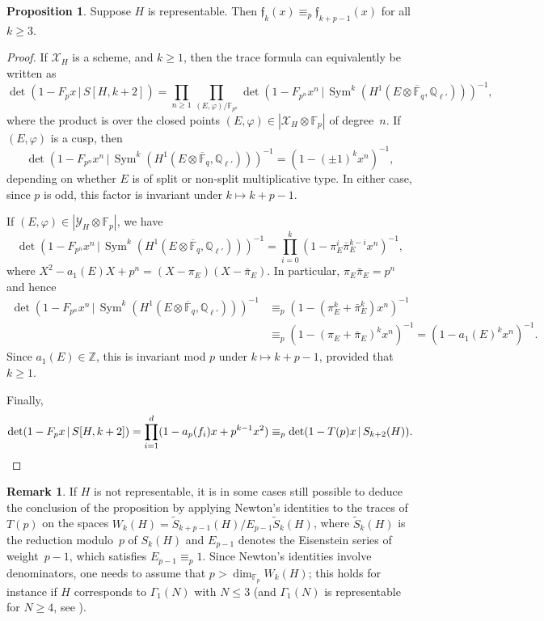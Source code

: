 \documentclass[10pt]{article}
\theoremstyle{definition}
\newtheorem{proposition}[theorem]{Proposition}
\newtheorem{remark}[theorem]{Remark}
\let\phi\varphi
\DeclareMathOperator\Sym{Sym}
\renewcommand{\:}{\colon}
\let\tl\widetilde
\newcommand{\bF}{\mathbb{F}}
\newcommand{\f}{\mathfrak{f}}
\begin{document}
\begin{proposition}\label{prop:pols}
    Suppose $H$ is representable. 
    Then $\f_{k}(x) \equiv_p \f_{k+p-1}(x)$ for all $k \geq 3$.
\end{proposition}

\begin{proof}
If $\mathcal{X}_H$ is a scheme, and $k \geq 1$, then the trace formula can equivalently be written as
\[
\det(1-F_px \, | \, S[H,k+2]) = \prod_{n \geq 1} \prod_{(E,\phi)/\mathbb F_{p^n}} \det(1-F_{p^n}x^n \, | \, \Sym^k(H^1(E \otimes \overline{\bF}_q, \mathbb Q_{\ell'})))^{-1},
\]
where the product is over the closed points $(E,\phi) \in |\mathcal{X}_H \otimes \mathbb F_p|$ of degree~$n$. If $(E,\phi)$ is a cusp, then 
\[
\det(1-F_{p^n}x^n \, | \, \Sym^k(H^1(E \otimes \overline{\bF}_q, \mathbb Q_{\ell'})))^{-1} = (1 - (\pm 1)^{k} x^n)^{-1},
\]
depending on whether $E$ is of split or non-split multiplicative type. In either case, since $p$ is odd, this factor is invariant under $k \mapsto k + p-1$.

If $(E,\phi) \in |\mathcal{Y}_H \otimes \mathbb F_p|$, we have
\[
\det(1-F_{p^n}x^n \, | \, \Sym^k(H^1(E\otimes \overline{\bF}_q, \mathbb Q_{\ell'})))^{-1} = \prod_{i=0}^k (1- \pi_E^i \bar{\pi}_E^{k-i}x^n)^{-1}, 
\]
where $X^2 - a_1(E) X + p^n = (X-\pi_E)(X-\bar{\pi}_E)$. In particular, $\pi_E \bar{\pi}_E = p^n$ and hence
\begin{align*}
\det(1-F_{p^n}x^n \, | \, \Sym^k(H^1(E\otimes \overline{\bF}_q, \mathbb Q_{\ell'})))^{-1} &\equiv_{p} (1-(\pi_E^k + \bar{\pi}_E^k)x^n)^{-1} \\
&\equiv_{p} (1 - (\pi_E + \bar{\pi}_E)^kx^n)^{-1} = (1-a_1(E)^kx^n)^{-1}.
\end{align*}
Since $a_1(E) \in \mathbb Z$, this is invariant mod $p$ under $k \mapsto k + p-1$, provided that $k \geq 1$.

Finally,
\[
\det(1-F_px \, | \, S[H,k+2]) = \prod_{i=1}^d (1 - a_p(f_i)x + p^{k-1}x^2) \equiv_p \det(1-T(p)x \, | \, S_{k+2}(H)). \qedhere
\]
\end{proof}

\begin{remark}
    If $H$ is not representable, it is in some cases still possible to deduce the conclusion of the proposition by applying Newton's identities to the traces of $T(p)$ on the spaces $W_k(H) = \tl{S}_{k+p-1}(H)/E_{p-1}\tl{S}_k(H)$, where $\tl{S}_k(H)$ is the reduction modulo~$p$ of $S_k(H)$ and $E_{p-1}$ denotes the Eisenstein series of weight~$p-1$, which satisfies $E_{p-1} \equiv_p 1$. Since Newton's identities involve denominators, one needs to assume that $p > \dim_{\mathbb F_p} W_k(H)$; this holds for instance if $H$ corresponds to $\Gamma_1(N)$ with $N \leq 3$
    (and $\Gamma_1(N)$ is representable for $N \geq 4$, see \cite[Cor.~2.7.3]{KatzMazur}).
\end{remark}
\end{document}
